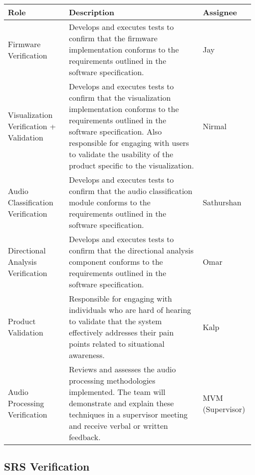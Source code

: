 \documentclass[12pt, titlepage]{article}
\begin{document}
\noindent
\begin{tabularx}{\textwidth}{|p{4cm}|X|p{3cm}|}
\hline
\textbf{Role} & \textbf{Description} & \textbf{Assignee} \\
\hline
Firmware Verification \label{role:firmware_verfication} & Develops and executes
tests to confirm that the firmware implementation conforms to the requirements
outlined in the software specification. & Jay \\
\hline

Visualization Verification + Validation \label{role:visual_vnv}& Develops and
executes tests to confirm that the visualization implementation conforms to the
requirements outlined in the software specification. Also responsible for
engaging with users to validate the usability of the product specific to the
visualization. & Nirmal \\
\hline

Audio Classification Verification \label{role:classification_verfication} &
Develops and executes tests to confirm that the audio classification module
conforms to the requirements outlined in the software specification. &
Sathurshan \\
\hline

Directional Analysis Verification \label{role:directional_verfication}& Develops
and executes tests to confirm that the directional analysis component conforms
to the requirements outlined in the software specification. & Omar \\
\hline

Product Validation \label{role:product_validation} & Responsible for engaging
with individuals who are hard of hearing to validate that the system effectively
addresses their pain points related to situational awareness. & Kalp \\
\hline

Audio Processing Verification \label{role:audio_processing_verification}  &
Reviews and assesses the audio processing methodologies implemented. The team
will demonstrate and explain these techniques in a supervisor meeting and
receive verbal or written feedback. & MVM (Supervisor) \\
\hline
\end{tabularx}

\subsection{SRS Verification}\label{sec:srs_verification}
\end{document}
